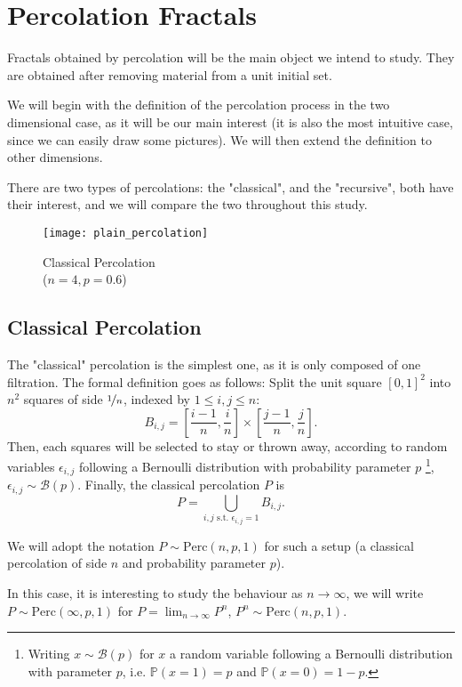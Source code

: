 \section{Percolation Fractals}
Fractals obtained by percolation will be the main object we intend to study. They are obtained after removing material from a unit initial set.

We will begin with the definition of the percolation process in the two dimensional case, as it will be our main interest (it is also the most intuitive case, since we can easily draw some pictures).
We will then extend the definition to other dimensions.

There are two types of percolations: the "classical", and the "recursive", both have their interest, and we will compare the two throughout this study.

\begin{wrapfigure}{r}{6.5cm}
	\vspace{-1.2cm}
	\centering
	\texttt{[image: plain\_percolation]}
	\caption{Classical Percolation\\($n=4, p=0.6$)}
	\label{fig:classicalPercolation}
\end{wrapfigure}
\subsection{Classical Percolation}
The "classical" percolation is the simplest one, as it is only composed of one filtration.
The formal definition goes as follows:
Split the unit square $\left[ 0,1 \right]^2$ into $n^2$ squares of side $\nicefrac{1}{n}$, indexed by $1 \leq i,j \leq n$:
$$B_{i,j} = \left[ \frac{i-1}{n}, \frac{i}{n} \right] \times \left[ \frac{j-1}{n}, \frac{j}{n} \right].$$
Then, each squares will be selected to stay or thrown away, according to random variables $\epsilon_{i,j}$ following a Bernoulli distribution with probability parameter $p$
\footnote{Writing $x \sim \mathcal{B}(p)$ for $x$ a random variable following a Bernoulli distribution with parameter $p$, i.e. $\mathbb{P}(x=1)=p$ and $\mathbb{P}(x=0)=1-p$.},
$\epsilon_{i,j} \sim \mathcal{B}(p)$.
Finally, the classical percolation $P$ is
$$P = \bigcup_{i,j \text{ s.t. } \epsilon_{i,j}=1} B_{i,j}.$$

We will adopt the notation $P \sim \text{Perc}(n,p,1)$ for such a setup (a classical percolation of side $n$ and probability parameter $p$).

In this case, it is interesting to study the behaviour as $n \to \infty$, we will write $P \sim \text{Perc}(\infty,p,1)$ for $P = \lim_{n \to \infty} P^n$, $P^n \sim \text{Perc}(n,p,1)$.

